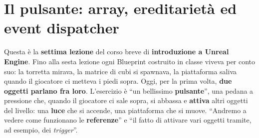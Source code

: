 %
%
%
%    
%

\chapter[Pulsante, ereditarietà ed event dispatcher]{Il pulsante: array, ereditarietà
ed event dispatcher}
\label{ue7:cap:pulsante}

Questa è la \textbf{settima lezione} del corso breve di \textbf{introduzione a Unreal
Engine}. Fino alla sesta lezione ogni Blueprint costruito in classe viveva per conto
suo: la torretta mirava, la matrice di cubi si spawnava, la piattaforma saliva quando il
giocatore ci metteva i piedi sopra. Oggi, per la prima volta, \textbf{due oggetti
parlano fra loro}. L'esercizio è ``un bellissimo \textbf{pulsante}'', una pedana a
pressione che, quando il giocatore ci sale sopra, si abbassa e \textbf{attiva} altri
oggetti del livello: una \textbf{luce} che si accende, una piattaforma che si muove.
``Andremo a vedere come funzionano le \textbf{referenze}'' e ``il fatto di attivare
vari oggetti tramite, ad esempio, dei \emph{trigger}''.

